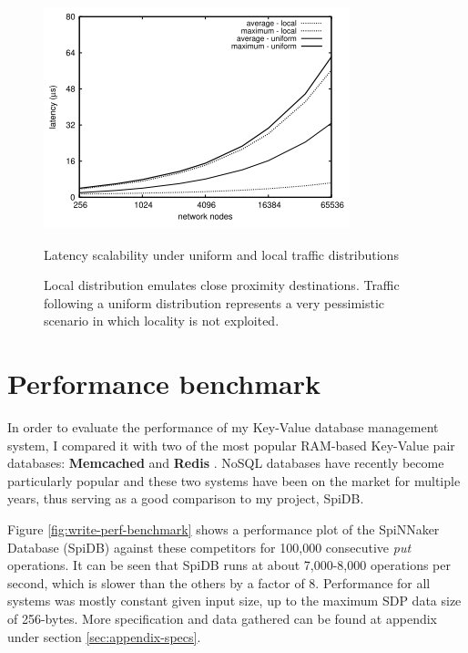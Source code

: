 \begin{figure}
\begin{center}
	\includegraphics[width=.7\textwidth, natwidth=336, natheight=243]{images/latency.png}
\end{center}
\caption{Latency scalability under uniform and local traffic distributions \cite{scalablecomm}}
\smallskip

\caption*{\footnotesize 
\setlength{\leftskip}{1.5cm}
\setlength{\rightskip}{1.5cm}
Local distribution emulates close proximity destinations. Traffic following a uniform distribution represents a very pessimistic scenario in which locality is not exploited.}

\label{fig:latency}
\end{figure}



\section{Performance benchmark}
In order to evaluate the performance of my Key-Value database management system, I compared it with two of the most popular RAM-based Key-Value pair databases: \textbf{Memcached} \cite{memcached} and \textbf{Redis} \cite{redis}. NoSQL databases have recently become particularly popular \cite{nosqlsurvey} and these two systems have been on the market for multiple years, thus serving as a good comparison to my project, SpiDB.

Figure \ref{fig:write-perf-benchmark} shows a performance plot of the SpiNNaker Database (SpiDB) against these competitors for 100,000 consecutive \textit{put} operations. It can be seen that SpiDB runs at about 7,000-8,000 operations per second, which is slower than the others by a factor of 8. Performance for all systems was mostly constant given input size, up to the maximum SDP data size of 256-bytes. More specification and data gathered can be found at appendix under section \ref{sec:appendix-specs}.

